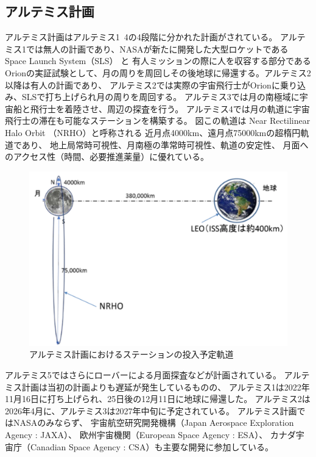 \subsection{アルテミス計画}
\label{subsection:月・火星の探査計画}
アルテミス計画はアルテミス1~4の4段階に分かれた計画がされている。
アルテミス1では無人の計画であり、NASAが新たに開発した大型ロケットである
Space Launch System（SLS） と 有人ミッションの際に人を収容する部分である
Orionの実証試験として、月の周りを周回しその後地球に帰還する。アルテミス2以降は有人の計画であり、
アルテミス2では実際の宇宙飛行士がOrionに乗り込み、SLSで打ち上げられ月の周りを周回する。
アルテミス3では月の南極域に宇宙船と飛行士を着陸させ、周辺の探査を行う。
アルテミス4では月の軌道に宇宙飛行士の滞在も可能なステーションを構築する。
図この軌道は Near Rectilinear Halo Orbit （NRHO）と呼称される
近⽉点4000km、遠⽉点75000kmの超楕円軌道であり、
地上局常時可視性、月南極の準常時可視性、軌道の安定性、
月面へのアクセス性（時間、必要推進薬量）に優れている\cite{kiban_dai48}。
\begin{figure}[tbh]
    \centering
    \includegraphics[width=0.7\textheight]{img/artemis_moon_station_orbit.pdf}
    \caption{アルテミス計画におけるステーションの投入予定軌道}
    \label{fig:artemis_moon_station_orbit}
    \begin{minipage}{\textwidth}
        \raggedright
    \end{minipage}
\end{figure}

アルテミス5ではさらにローバーによる月面探査などが計画されている。
アルテミス計画は当初の計画よりも遅延が発生しているものの、
アルテミス1は2022年11月16日に打ち上げられ、25日後の12月11日に地球に帰還した。
アルテミス2は2026年4月に、アルテミス3は2027年中旬に予定されている。
アルテミス計画ではNASAのみならず、
宇宙航空研究開発機構（Japan Aerospace Exploration Agency : JAXA）、
欧州宇宙機関（European Space Agency : ESA）、
カナダ宇宙庁（Canadian Space Agency : CSA）も主要な開発に参加している。
\cite{jaxa2021}

